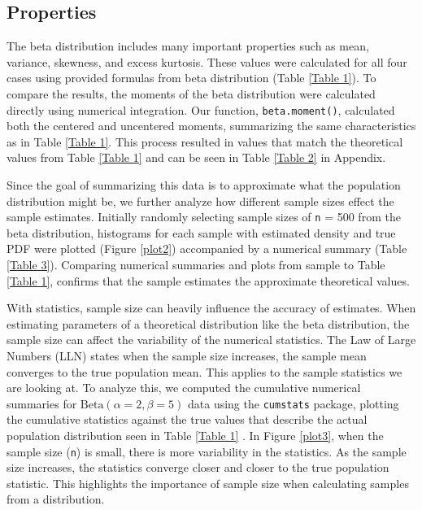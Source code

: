 \documentclass{article}\usepackage[]{graphicx}\usepackage[]{xcolor}
\begin{document}
\begin{multicols}{2}
\section{Properties}
The beta distribution includes many important properties such as mean, variance, skewness, and excess kurtosis. These values were calculated for all four cases using provided formulas from beta distribution (Table \ref{Table 1}). To compare the results, the moments of the beta distribution were calculated directly using numerical integration. Our function, \texttt{beta.moment()}, calculated both the centered and uncentered moments, summarizing the same characteristics as in Table \ref{Table 1}. This process resulted in values that match the theoretical values from Table \ref{Table 1} and can be seen in Table \ref{Table 2} in Appendix. 

Since the goal of summarizing this data is to approximate what the population distribution might be, we further analyze how different sample sizes effect the sample estimates. Initially randomly selecting sample sizes of \texttt{n} = 500 from the beta distribution, histograms for each sample with estimated density and true PDF were plotted (Figure \ref{plot2}) accompanied by a numerical summary (Table \ref{Table 3}). Comparing numerical summaries and plots from sample to Table \ref{Table 1}, confirms that the sample estimates the approximate theoretical values. 

With statistics, sample size can heavily influence the accuracy of estimates. When estimating parameters of a theoretical distribution like the beta distribution, the sample size can affect the variability of the numerical statistics. The Law of Large Numbers (LLN) states when the sample size increases, the sample mean converges to the true population mean. This applies to the sample statistics we are looking at. To analyze this, we computed the cumulative numerical summaries for \(\text{Beta}(\alpha = 2, \beta = 5)\) data using the \texttt{cumstats} package, plotting the cumulative statistics against the true values that describe the actual population distribution seen in Table \ref{Table 1} \citep{Cumstats}. In Figure \ref{plot3}, when the sample size (\texttt{n}) is small, there is more variability in the statistics. As the sample size increases, the statistics converge closer and closer to the true population statistic. This highlights the importance of sample size when calculating samples from a distribution.


\end{multicols}
\end{document}
